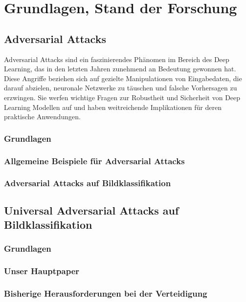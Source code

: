 \section{Grundlagen, Stand der Forschung} 
\subsection{Adversarial Attacks}

Adversarial Attacks sind ein faszinierendes Phänomen im Bereich des Deep Learning, das in den letzten Jahren zunehmend an Bedeutung gewonnen hat. Diese Angriffe beziehen sich auf gezielte Manipulationen von Eingabedaten, die darauf abzielen, neuronale Netzwerke zu täuschen und falsche Vorhersagen zu erzwingen. Sie werfen wichtige Fragen zur Robustheit und Sicherheit von Deep Learning Modellen auf und haben weitreichende Implikationen für deren praktische Anwendungen. 

\subsubsection{Grundlagen} 

\subsubsection{Allgemeine Beispiele für Adversarial Attacks} 
\subsubsection{Adversarial Attacks auf Bildklassifikation} 
\subsection{Universal Adversarial Attacks auf Bildklassifikation} 
\subsubsection{Grundlagen}
\subsubsection{Unser Hauptpaper}
\subsubsection{Bisherige Herausforderungen bei der Verteidigung}